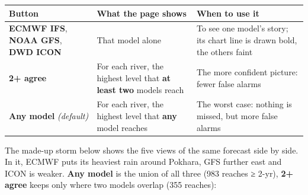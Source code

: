\documentclass[
  10pt,
]{article}
\begin{document}
\begin{longtable}[]{@{}lll@{}}
\toprule
\begin{minipage}[b]{0.30\columnwidth}\raggedright
Button\strut
\end{minipage} & \begin{minipage}[b]{0.30\columnwidth}\raggedright
What the page shows\strut
\end{minipage} & \begin{minipage}[b]{0.30\columnwidth}\raggedright
When to use it\strut
\end{minipage}\tabularnewline
\midrule
\endhead
\begin{minipage}[t]{0.30\columnwidth}\raggedright
\textbf{ECMWF IFS}, \textbf{NOAA GFS}, \textbf{DWD ICON}\strut
\end{minipage} & \begin{minipage}[t]{0.30\columnwidth}\raggedright
That model alone\strut
\end{minipage} & \begin{minipage}[t]{0.30\columnwidth}\raggedright
To see one model's story; its chart line is drawn bold, the others
faint\strut
\end{minipage}\tabularnewline
\begin{minipage}[t]{0.30\columnwidth}\raggedright
\textbf{2+ agree}\strut
\end{minipage} & \begin{minipage}[t]{0.30\columnwidth}\raggedright
For each river, the highest level that \textbf{at least two} models
reach\strut
\end{minipage} & \begin{minipage}[t]{0.30\columnwidth}\raggedright
The more confident picture: fewer false alarms\strut
\end{minipage}\tabularnewline
\begin{minipage}[t]{0.30\columnwidth}\raggedright
\textbf{Any model} \emph{(default)}\strut
\end{minipage} & \begin{minipage}[t]{0.30\columnwidth}\raggedright
For each river, the highest level that \textbf{any} model reaches\strut
\end{minipage} & \begin{minipage}[t]{0.30\columnwidth}\raggedright
The worst case: nothing is missed, but more false alarms\strut
\end{minipage}\tabularnewline
\bottomrule
\end{longtable}

The made-up storm below shows the five views of the same forecast side
by side. In it, ECMWF puts its heaviest rain around Pokhara, GFS further
east and ICON is weaker. \textbf{Any model} is the union of all three
(983 reaches ≥ 2-yr), \textbf{2+ agree} keeps only where two models
overlap (355 reaches):
\end{document}
